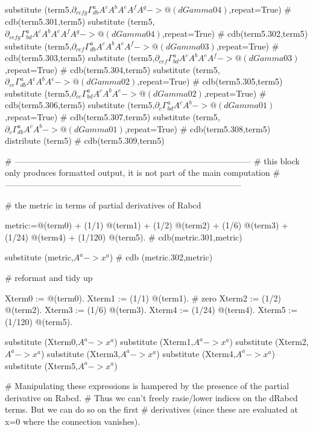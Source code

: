 \documentclass[12pt]{cdblatex}
\begin{document}
\begin{cadabra}
   substitute (term5,$\partial_{c e f g}{\Gamma^{a}_{d b}}A^{c}A^{b}A^{e}A^{f}A^{g} -> @(dGamma04)$,repeat=True)  # cdb(term5.301,term5)
   substitute (term5,$\partial_{c e f g}{\Gamma^{a}_{b d}}A^{c}A^{b}A^{e}A^{f}A^{g} -> @(dGamma04)$,repeat=True)  # cdb(term5.302,term5)
   substitute (term5,$\partial_{c e f}{\Gamma^{a}_{d b}}A^{c}A^{b}A^{e}A^{f} -> @(dGamma03)$,repeat=True)         # cdb(term5.303,term5)
   substitute (term5,$\partial_{c e f}{\Gamma^{a}_{b d}}A^{c}A^{b}A^{e}A^{f} -> @(dGamma03)$,repeat=True)         # cdb(term5.304,term5)
   substitute (term5,$\partial_{c e}{\Gamma^{a}_{d b}}A^{c}A^{b}A^{e} -> @(dGamma02)$,repeat=True)                # cdb(term5.305,term5)
   substitute (term5,$\partial_{c e}{\Gamma^{a}_{b d}}A^{c}A^{b}A^{e} -> @(dGamma02)$,repeat=True)                # cdb(term5.306,term5)
   substitute (term5,$\partial_{c}{\Gamma^{a}_{b d}}A^{c}A^{b} -> @(dGamma01)$,repeat=True)                       # cdb(term5.307,term5)
   substitute (term5,$\partial_{c}{\Gamma^{a}_{d b}}A^{c}A^{b} -> @(dGamma01)$,repeat=True)                       # cdb(term5.308,term5)
   distribute (term5)                                                                                             # cdb(term5.309,term5)

   # ------------------------------------------------------------------------------------
   # this block only produces formatted output, it is not part of the main computation
   # ------------------------------------------------------------------------------------

   # the metric in terms of partial derivatives of Rabcd

   metric:=@(term0)
         + (1/1) @(term1)
         + (1/2) @(term2)
         + (1/6) @(term3)
         + (1/24) @(term4)
         + (1/120) @(term5).  # cdb(metric.301,metric)

   substitute (metric,$A^{a} -> x^{a}$)  # cdb (metric.302,metric)

   # reformat and tidy up

   Xterm0 := @(term0).
   Xterm1 := (1/1) @(term1).     # zero
   Xterm2 := (1/2) @(term2).
   Xterm3 := (1/6) @(term3).
   Xterm4 := (1/24) @(term4).
   Xterm5 := (1/120) @(term5).

   substitute (Xterm0,$A^{a} -> x^{a}$)
   substitute (Xterm1,$A^{a} -> x^{a}$)
   substitute (Xterm2,$A^{a} -> x^{a}$)
   substitute (Xterm3,$A^{a} -> x^{a}$)
   substitute (Xterm4,$A^{a} -> x^{a}$)
   substitute (Xterm5,$A^{a} -> x^{a}$)

   # Manipulating these expressions is hampered by the presence of the partial derivative on Rabcd.
   # Thus we can't freely rasie/lower indices on the dRabcd terms. But we can do so on the first
   # derivatives (since these are evaluated at x=0 where the connection vanishes).


\end{cadabra}
\end{document}
